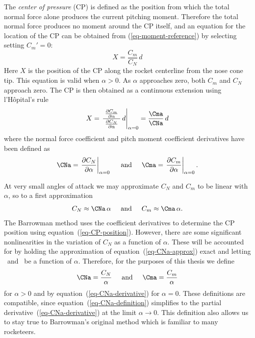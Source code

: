 The {\it center of pressure} (CP) is defined as the position from
which the total normal force alone produces the current pitching
moment.  Therefore the total normal force produces no moment around
the CP itself, and an equation for the location of the CP
can be obtained from (\ref{eq-moment-reference}) by selecting setting
$C_m'=0$:
%
\begin{equation}
X = \frac{C_m}{C_N}\,d
\end{equation}
%
Here $X$ is the position of the CP along the rocket centerline from
the nose cone tip.  This equation is valid when $\alpha>0$.  As
$\alpha$ approaches zero, both $C_m$ and $C_N$ approach zero.  The CP
is then obtained as a continuous extension using l'Hôpital's rule
%
\begin{equation}
X = \left.\frac{\;\frac{\partial C_m}{\partial\alpha}\;}
          {\;\frac{\partial C_N}{\partial\alpha}\;}\,d\right|_{\alpha=0}
  = \frac{\Cma}{\CNa}\,d
\label{eq-CP-position}
\end{equation}
%
where the normal force coefficient and pitch moment coefficient
derivatives have been defined as
%
\begin{equation}
\CNa = \left.\frac{\partial C_N}{\partial\alpha}\right|_{\alpha=0}
\hspace{5mm}\mbox{and}\hspace{5mm}
\Cma = \left.\frac{\partial C_m}{\partial\alpha}\right|_{\alpha=0}.
\label{eq-CNa-derivative}
\end{equation}

At very small angles of attack we may approximate $C_N$ and $C_m$ to
be linear with $\alpha$, so to a first approximation
%
\begin{equation}
C_N \approx \CNa\,\alpha
\hspace{5mm}\mbox{and}\hspace{5mm}
C_m \approx \Cma\,\alpha.
\label{eq-CNa-approx}
\end{equation}
%
The Barrowman method uses the coefficient derivatives to determine the
CP position using equation~(\ref{eq-CP-position}).  However, there are
some significant nonlinearities in the variation of $C_N$ as a
function of $\alpha$.  These will be accounted for by holding the
approximation of equation~(\ref{eq-CNa-approx}) exact and letting
\CNa\ and \Cma\ be a function of $\alpha$.  Therefore, for the
purposes of this thesis we define
%
\begin{equation}
\CNa = \frac{C_N}{\alpha}
\hspace{5mm}\mbox{and}\hspace{5mm}
\Cma = \frac{C_m}{\alpha}
\label{eq-CNa-definition}
\end{equation}
%
for $\alpha>0$ and by equation~(\ref{eq-CNa-derivative}) for
$\alpha=0$.  These definitions are compatible, since
equation~(\ref{eq-CNa-definition}) simplifies to the partial
derivative~(\ref{eq-CNa-derivative}) at the limit
$\alpha\rightarrow0$.  This definition also allows us to stay true to
Barrowman's original method which is familiar to many rocketeers.


